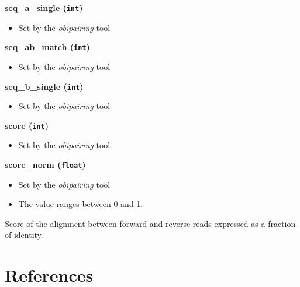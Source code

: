 \documentclass[
  letterpaper,
  DIV=11,
  numbers=noendperiod]{scrreprt}
\providecommand{\tightlist}{%
  \setlength{\itemsep}{0pt}\setlength{\parskip}{0pt}}\usepackage{longtable,booktabs,array}
\begin{document}
\textbf{seq\_a\_single (\texttt{int})}

\begin{itemize}
\tightlist
\item
  Set by the \emph{obipairing} tool
\end{itemize}

\textbf{seq\_ab\_match (\texttt{int})}

\begin{itemize}
\tightlist
\item
  Set by the \emph{obipairing} tool
\end{itemize}

\textbf{seq\_b\_single (\texttt{int})}

\begin{itemize}
\tightlist
\item
  Set by the \emph{obipairing} tool
\end{itemize}

\textbf{score (\texttt{int})}

\begin{itemize}
\tightlist
\item
  Set by the \emph{obipairing} tool
\end{itemize}

\textbf{score\_norm (\texttt{float})}

\begin{itemize}
\tightlist
\item
  Set by the \emph{obipairing} tool
\item
  The value ranges between 0 and 1.
\end{itemize}

Score of the alignment between forward and reverse reads expressed as a
fraction of identity.

\hypertarget{references}{%
\chapter*{References}\label{references}}

\end{document}
